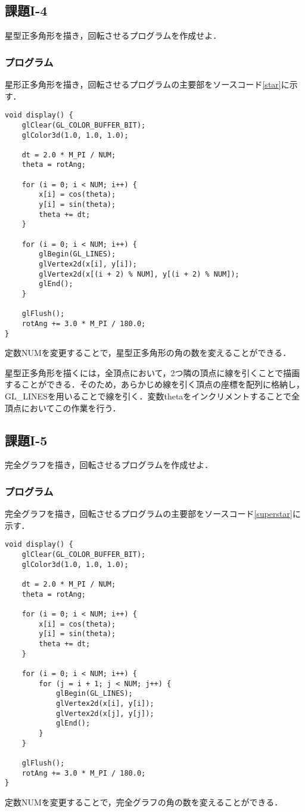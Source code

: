 \documentclass[]{jarticle}
\begin{document}
\subsection{課題I-4}
星型正多角形を描き，回転させるプログラムを作成せよ．
\subsubsection{プログラム}
星形正多角形を描き，回転させるプログラムの主要部をソースコード\ref{star}に示す．
\begin{lstlisting}[caption=星形正多角形の描画と回転,label=star]
void display() {
    glClear(GL_COLOR_BUFFER_BIT);
    glColor3d(1.0, 1.0, 1.0);

    dt = 2.0 * M_PI / NUM;
    theta = rotAng;
    
    for (i = 0; i < NUM; i++) {
        x[i] = cos(theta);
        y[i] = sin(theta);
        theta += dt;
    }

    for (i = 0; i < NUM; i++) {
        glBegin(GL_LINES);
        glVertex2d(x[i], y[i]);
        glVertex2d(x[(i + 2) % NUM], y[(i + 2) % NUM]);
        glEnd();
    }

    glFlush();
    rotAng += 3.0 * M_PI / 180.0;
}
\end{lstlisting}
定数NUMを変更することで，星型正多角形の角の数を変えることができる．

星型正多角形を描くには，全頂点において，2つ隣の頂点に線を引くことで描画することができる．そのため，あらかじめ線を引く頂点の座標を配列に格納し，GL\_LINESを用いることで線を引く．変数thetaをインクリメントすることで全頂点においてこの作業を行う．

\subsection{課題I-5}
完全グラフを描き，回転させるプログラムを作成せよ．
\subsubsection{プログラム}
完全グラフを描き，回転させるプログラムの主要部をソースコード\ref{superstar}に示す．
\begin{lstlisting}[caption=完全グラフの描画と回転,label=superstar]
void display() {
    glClear(GL_COLOR_BUFFER_BIT);
    glColor3d(1.0, 1.0, 1.0);

    dt = 2.0 * M_PI / NUM;
    theta = rotAng;

    for (i = 0; i < NUM; i++) {
        x[i] = cos(theta);
        y[i] = sin(theta);
        theta += dt;
    }

    for (i = 0; i < NUM; i++) {
        for (j = i + 1; j < NUM; j++) {
            glBegin(GL_LINES);
            glVertex2d(x[i], y[i]);
            glVertex2d(x[j], y[j]);
            glEnd();
        }
    }

    glFlush();
    rotAng += 3.0 * M_PI / 180.0;
}
\end{lstlisting}
定数NUMを変更することで，完全グラフの角の数を変えることができる．
\end{document}
